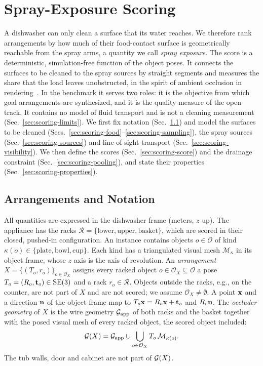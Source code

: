 \section{Spray-Exposure Scoring}
\label{sec:scoring}

A dishwasher can only clean a surface that its water reaches.
We therefore rank arrangements by how much of their food-contact surface is geometrically reachable from the spray arms, a quantity we call \emph{spray exposure}.
The score is a deterministic, simulation-free function of the object poses.
It connects the surfaces to be cleaned to the spray sources by straight segments and measures the share that the load leaves unobstructed, in the spirit of ambient occlusion in rendering~\cite{zhukov1998ambient}.
In the benchmark it serves two roles: it is the objective from which goal arrangements are synthesized, and it is the quality measure of the open track.
It contains no model of fluid transport and is not a cleaning measurement (Sec.~\ref{sec:scoring-limits}).
We first fix notation (Sec.~\ref{sec:scoring-notation}) and model the surfaces to be cleaned (Secs.~\ref{sec:scoring-food}--\ref{sec:scoring-sampling}), the spray sources (Sec.~\ref{sec:scoring-sources}) and line-of-sight transport (Sec.~\ref{sec:scoring-visibility}).
We then define the scores (Sec.~\ref{sec:scoring-score}) and the drainage constraint (Sec.~\ref{sec:scoring-pooling}), and state their properties (Sec.~\ref{sec:scoring-properties}).

\subsection{Arrangements and Notation}
\label{sec:scoring-notation}

All quantities are expressed in the dishwasher frame (meters, $z$ up).
The appliance has the racks $\mathcal{R}=\{\text{lower},\text{upper},\text{basket}\}$, which are scored in their closed, pushed-in configuration.
An instance contains objects $o\in\mathcal{O}$ of kind $\kappa(o)\in\{\text{plate},\text{bowl},\text{cup}\}$.
Each kind has a triangulated visual mesh $\mathcal{M}_\kappa$ in its object frame, whose $z$ axis is the axis of revolution.
An \emph{arrangement} $X=\{(T_o,r_o)\}_{o\in\mathcal{O}_X}$ assigns every racked object $o\in\mathcal{O}_X\subseteq\mathcal{O}$ a pose $T_o=(R_o,\mathbf{t}_o)\in\mathrm{SE}(3)$ and a rack $r_o\in\mathcal{R}$.
Objects outside the racks, e.g., on the counter, are not part of $X$ and are not scored; we assume $\mathcal{O}_X\neq\emptyset$.
A point $\mathbf{x}$ and a direction $\mathbf{n}$ of the object frame map to $T_o\mathbf{x}=R_o\mathbf{x}+\mathbf{t}_o$ and $R_o\mathbf{n}$.
The \emph{occluder geometry} of $X$ is the wire geometry $\mathcal{G}_{\mathrm{app}}$ of both racks and the basket together with the posed visual mesh of every racked object, the scored object included:
\begin{equation}
\mathcal{G}(X)=\mathcal{G}_{\mathrm{app}}\cup\bigcup_{o\in\mathcal{O}_X}T_o\,\mathcal{M}_{\kappa(o)}.
\label{eq:occluders}
\end{equation}
The tub walls, door and cabinet are not part of $\mathcal{G}(X)$.

